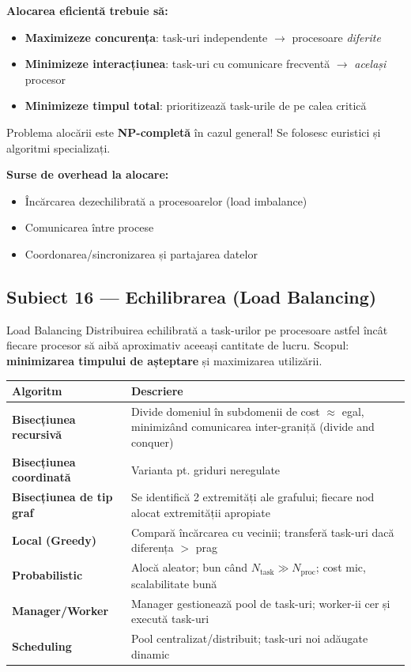 \documentclass[a4paper,11pt]{article}
\newcommand{\thead}[1]{\cellcolor{tblh}\color{white}\textbf{#1}}
\newcommand{\subiect}[2]{\subsection{Subiect \textcolor{numcol}{#1} — #2}}
\begin{document}
\textbf{Alocarea eficientă trebuie să:}
\begin{itemize}[noitemsep]
  \item \textbf{Maximizeze concurența}: task-uri independente $\to$ procesoare \emph{diferite}
  \item \textbf{Minimizeze interacțiunea}: task-uri cu comunicare frecventă $\to$ \emph{același} procesor
  \item \textbf{Minimizeze timpul total}: prioritizează task-urile de pe calea critică
\end{itemize}

\begin{notebox}
Problema alocării este \textbf{NP-completă} în cazul general! Se folosesc euristici și algoritmi specializați.
\end{notebox}

\textbf{Surse de overhead la alocare:}
\begin{itemize}[noitemsep]
  \item Încărcarea dezechilibrată a procesoarelor (load imbalance)
  \item Comunicarea între procese
  \item Coordonarea/sincronizarea și partajarea datelor
\end{itemize}

\subiect{16}{Echilibrarea (Load Balancing)}

\begin{defbox}{Load Balancing}
Distribuirea echilibrată a task-urilor pe procesoare astfel încât fiecare procesor să aibă aproximativ aceeași cantitate de lucru. Scopul: \textbf{minimizarea timpului de așteptare} și maximizarea utilizării.
\end{defbox}

\begin{center}
\begin{tabularx}{\textwidth}{lX}
\toprule
\thead{Algoritm} & \thead{Descriere} \\
\midrule
\textbf{Bisecțiunea recursivă} & Divide domeniul în subdomenii de cost $\approx$ egal, minimizând comunicarea inter-graniță (divide and conquer) \\
\textbf{Bisecțiunea coordinată} & Varianta pt. griduri neregulate \\
\textbf{Bisecțiunea de tip graf} & Se identifică 2 extremități ale grafului; fiecare nod alocat extremității apropiate \\
\textbf{Local (Greedy)} & Compară încărcarea cu vecinii; transferă task-uri dacă diferența $>$ prag \\
\textbf{Probabilistic} & Alocă aleator; bun când $N_\text{task} \gg N_\text{proc}$; cost mic, scalabilitate bună \\
\textbf{Manager/Worker} & Manager gestionează pool de task-uri; worker-ii cer și execută task-uri \\
\textbf{Scheduling} & Pool centralizat/distribuit; task-uri noi adăugate dinamic \\
\bottomrule
\end{tabularx}
\end{center}
\end{document}
